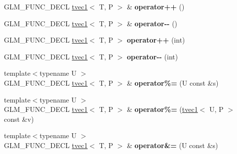 \begin{DoxyCompactItemize}
\item 
\hypertarget{structglm_1_1tvec1_a073c75830716722cd4ffcb516788cec5}{G\-L\-M\-\_\-\-F\-U\-N\-C\-\_\-\-D\-E\-C\-L \hyperlink{structglm_1_1tvec1}{tvec1}$<$ T, P $>$ \& {\bfseries operator++} ()}\label{structglm_1_1tvec1_a073c75830716722cd4ffcb516788cec5}

\item 
\hypertarget{structglm_1_1tvec1_ae2afe02d40b7a469d33543f16307611a}{G\-L\-M\-\_\-\-F\-U\-N\-C\-\_\-\-D\-E\-C\-L \hyperlink{structglm_1_1tvec1}{tvec1}$<$ T, P $>$ \& {\bfseries operator-\/-\/} ()}\label{structglm_1_1tvec1_ae2afe02d40b7a469d33543f16307611a}

\item 
\hypertarget{structglm_1_1tvec1_a4dbefeaefe398e52093be02b638047cd}{G\-L\-M\-\_\-\-F\-U\-N\-C\-\_\-\-D\-E\-C\-L \hyperlink{structglm_1_1tvec1}{tvec1}$<$ T, P $>$ {\bfseries operator++} (int)}\label{structglm_1_1tvec1_a4dbefeaefe398e52093be02b638047cd}

\item 
\hypertarget{structglm_1_1tvec1_af4251163c1a4e5a83e2c09e4dd685ecd}{G\-L\-M\-\_\-\-F\-U\-N\-C\-\_\-\-D\-E\-C\-L \hyperlink{structglm_1_1tvec1}{tvec1}$<$ T, P $>$ {\bfseries operator-\/-\/} (int)}\label{structglm_1_1tvec1_af4251163c1a4e5a83e2c09e4dd685ecd}

\item 
\hypertarget{structglm_1_1tvec1_a2bcd9d7e33a00a42810169c33015bdc5}{{\footnotesize template$<$typename U $>$ }\\G\-L\-M\-\_\-\-F\-U\-N\-C\-\_\-\-D\-E\-C\-L \hyperlink{structglm_1_1tvec1}{tvec1}$<$ T, P $>$ \& {\bfseries operator\%=} (U const \&s)}\label{structglm_1_1tvec1_a2bcd9d7e33a00a42810169c33015bdc5}

\item 
\hypertarget{structglm_1_1tvec1_acb4b8e73890ac7f9a0b4700c1c268500}{{\footnotesize template$<$typename U $>$ }\\G\-L\-M\-\_\-\-F\-U\-N\-C\-\_\-\-D\-E\-C\-L \hyperlink{structglm_1_1tvec1}{tvec1}$<$ T, P $>$ \& {\bfseries operator\%=} (\hyperlink{structglm_1_1tvec1}{tvec1}$<$ U, P $>$ const \&v)}\label{structglm_1_1tvec1_acb4b8e73890ac7f9a0b4700c1c268500}

\item 
\hypertarget{structglm_1_1tvec1_a9797dc526cd65772f9e0cbc2f3e69d4c}{{\footnotesize template$<$typename U $>$ }\\G\-L\-M\-\_\-\-F\-U\-N\-C\-\_\-\-D\-E\-C\-L \hyperlink{structglm_1_1tvec1}{tvec1}$<$ T, P $>$ \& {\bfseries operator\&=} (U const \&s)}\label{structglm_1_1tvec1_a9797dc526cd65772f9e0cbc2f3e69d4c}


\end{DoxyCompactItemize}
